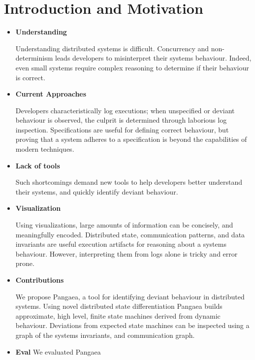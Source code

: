 \section{Introduction and Motivation}
\label{sec:intro}


\begin{itemize}
    \item \textbf{Understanding}

        Understanding distributed systems is difficult. Concurrency
        and non-determinism leads developers to misinterpret their
        systems behaviour. Indeed, even small systems require complex
        reasoning to determine if their behaviour is correct.

    \item \textbf{Current Approaches}
        
        Developers characteristically log executions; when unspecified or
        deviant behaviour is observed, the culprit is determined
        through laborious log inspection. Specifications are useful for
        defining correct behaviour, but proving that a system adheres
        to a specification is beyond the capabilities of modern
        techniques.


    \item \textbf{Lack of tools}

        Such shortcomings demand new tools to help developers
        better understand their systems, and quickly identify deviant
        behaviour.

    \item \textbf{Visualization}

        Using visualizations, large amounts of information can be
        concisely, and meaningfully encoded. Distributed state,
        communication patterns, and data invariants are useful
        execution artifacts for reasoning about a systems behaviour.
        However, interpreting them from logs alone is tricky and error
        prone.

    \item \textbf{Contributions}

        We propose Pangaea, a tool for identifying deviant behaviour
        in distributed systems. Using novel distributed state
        differentiation Pangaea builds approximate, high level, finite
        state machines derived from dynamic behaviour. Deviations
        from expected state machines can be inspected using a graph of
        the systems invariants, and communication graph.

    \item \textbf{Eval}
        We evaluated Pangaea 
\end{itemize}


